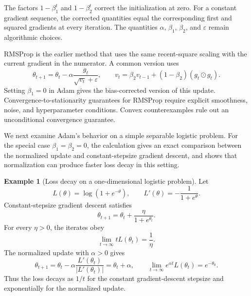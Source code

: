 \documentclass[11pt,twoside]{article}
\theoremstyle{definition}
\newtheorem{example}[theorem]{Example}
\theoremstyle{remark}
\begin{document}
The factors $1-\beta_1^t$ and $1-\beta_2^t$ correct the initialization at
zero. For a constant gradient sequence, the corrected quantities equal the
corresponding first and squared gradients at every iteration. The quantities
$\alpha$, $\beta_1$, $\beta_2$, and $\varepsilon$ remain algorithmic choices.

RMSProp is the earlier method that uses the same recent-square scaling with
the current gradient in the numerator. A common version uses
\begin{equation}
 \theta_{t+1}=\theta_t-\alpha
 \frac{g_t}{\sqrt{v_t}+\varepsilon},
 \qquad
 v_t=\beta_2v_{t-1}+(1-\beta_2)(g_t\odot g_t).
 \label{eq:rmsprop-update}
\end{equation}
Setting $\beta_1=0$ in Adam gives the bias-corrected version of this update.
Convergence-to-stationarity guarantees for RMSProp require explicit
smoothness, noise, and hyperparameter conditions. Convex counterexamples rule
out an unconditional convergence guarantee.

We next examine Adam's behavior on a simple separable logistic problem.
For the special case $\beta_1=\beta_2=0$, the calculation gives an exact
comparison between the normalized update and constant-stepsize gradient
descent, and shows that normalization can produce faster loss decay in this
setting.
\begin{example}[Loss decay on a one-dimensional logistic problem]
\label{ex:logistic-normalization}
Let
\begin{equation}
 L(\theta)=\log(1+e^{-\theta}),
 \qquad
 L'(\theta)=-\frac1{1+e^\theta}.
 \label{eq:scalar-logistic-loss}
\end{equation}
Constant-stepsize gradient descent satisfies
\begin{equation}
 \theta_{t+1}=\theta_t+\frac\eta{1+e^{\theta_t}}.
 \label{eq:scalar-logistic-gd}
\end{equation}
For every $\eta>0$, the iterates obey
\begin{equation}
 \lim_{t\to\infty}tL(\theta_t)=\frac1\eta.
 \label{eq:scalar-logistic-gd-rate}
\end{equation}
The normalized update with $\alpha>0$ gives
\begin{equation}
 \theta_{t+1}
 =\theta_t-\alpha\frac{L'(\theta_t)}{|L'(\theta_t)|}
  =\theta_t+\alpha,
 \qquad
 \lim_{t\to\infty}e^{\alpha t}L(\theta_t)
 =e^{-\theta_0}.
 \label{eq:scalar-logistic-normalized-rate}
\end{equation}
Thus the loss decays as $1/t$ for the constant gradient-descent stepsize and
exponentially for the normalized update.
\end{example}
\end{document}
